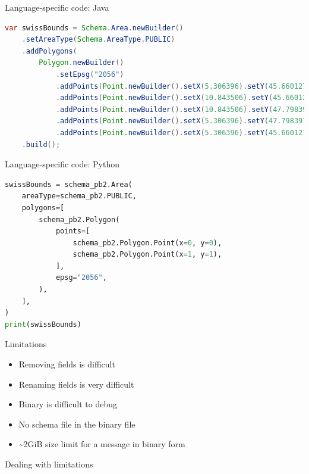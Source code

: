 \documentclass{beamer}
\begin{document}
\begin{frame}[fragile]{Language-specific code: Java}
\begin{lstlisting}[language=java,caption={Create and access proto message in Java}]
var swissBounds = Schema.Area.newBuilder()
    .setAreaType(Schema.AreaType.PUBLIC)
    .addPolygons(
        Polygon.newBuilder()
            .setEpsg("2056")
            .addPoints(Point.newBuilder().setX(5.306396).setY(45.660127))
            .addPoints(Point.newBuilder().setX(10.843506).setY(45.660127))
            .addPoints(Point.newBuilder().setX(10.843506).setY(47.798397))
            .addPoints(Point.newBuilder().setX(5.306396).setY(47.798397))
            .addPoints(Point.newBuilder().setX(5.306396).setY(45.660127)))
    .build();
\end{lstlisting}
\end{frame}

\begin{frame}[fragile]{Language-specific code: Python}
\begin{lstlisting}[language=python,caption={Create and access proto message in Python}]
swissBounds = schema_pb2.Area(
    areaType=schema_pb2.PUBLIC,
    polygons=[
        schema_pb2.Polygon(
            points=[
                schema_pb2.Polygon.Point(x=0, y=0),
                schema_pb2.Polygon.Point(x=1, y=1),
            ],
            epsg="2056",
        ),
    ],
)
print(swissBounds)
\end{lstlisting}
\end{frame}

\begin{frame}{Limitations}
\begin{itemize}[label=\Sey{}]
\item Removing fields is difficult
\item Renaming fields is very difficult
\item Binary is difficult to debug
\item No schema file in the binary file
\item \textasciitilde2GiB size limit for a message in binary form
\end{itemize}
\end{frame}

\begin{frame}{Dealing with limitations}

\end{frame}
\end{document}
